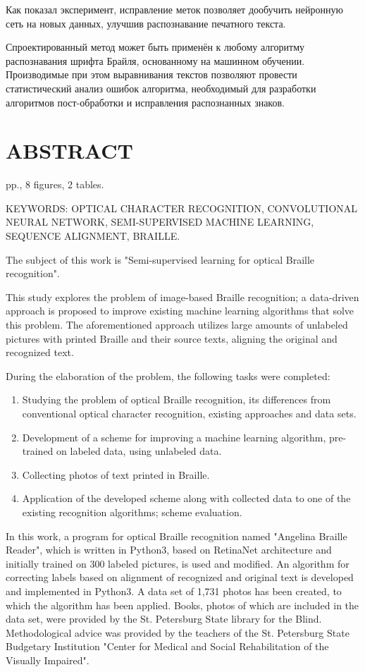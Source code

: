 \documentclass{main.tex}[subfiles]
\begin{document}
Как показал эксперимент, исправление меток позволяет дообучить нейронную сеть на новых данных, улучшив распознавание печатного текста.

Спроектированный метод может быть применён к любому алгоритму распознавания шрифта Брайля, основанному на машинном обучении.
Производимые при этом выравнивания текстов позволяют провести статистический анализ ошибок алгоритма, необходимый для разработки алгоритмов пост-обработки и исправления распознанных знаков.

\newpage
\thispagestyle{empty}
\section*{ABSTRACT}

\pageref*{LastPage} pp., 8 figures, 2 tables.

KEYWORDS: OPTICAL CHARACTER RECOGNITION, CONVOLUTIONAL\\
\noindent NEU\-RAL NETWORK, SEMI-SUPERVISED MACHINE LEARNING, SE\-QUENCE ALIGN\-MENT, BRAILLE.

The subject of this work is "Semi-supervised learning for optical Braille recog\-ni\-ti\-on".

This study explores the problem of image-based Braille recognition; a data-driven approach is proposed to improve existing machine learning algorithms that solve this problem.
The aforementioned approach utilizes large amounts of unlabeled pictures with printed Braille and their source texts, aligning the original and recognized text.

During the elaboration of the problem, the following tasks were completed:
\begin{enumerate}[noitemsep]
    \item Studying the problem of optical Braille recognition, its differences from con\-ven\-ti\-o\-nal optical character recognition, existing approaches and data sets.
    \item Development of a scheme for improving a machine learning algorithm, pre-trained on labeled data, using unlabeled data.
    \item Collecting photos of text printed in Braille.
    \item Application of the developed scheme along with collected data to one of the existing recognition algorithms; scheme evaluation.
\end{enumerate}

In this work, a program for optical Braille recognition named "Angelina Braille Reader"\hspace{0pt}, which is written in Python3, based on Retina\-Net architecture and initially trained on 300 labeled pictures, is used and modified.
An algorithm for correcting labels based on alignment of recognized and original text is developed and implemented in Python3.
A data set of 1,731 photos has been created, to which the algorithm has been applied.
Books, photos of which are included in the data set, were provided by the St. Petersburg State library for the Blind.
Methodological advice was provided by the teachers of the St. Petersburg State Budgetary Institution "Center for Medical and Social Rehabilitation of the Visually Impaired".
\end{document}
